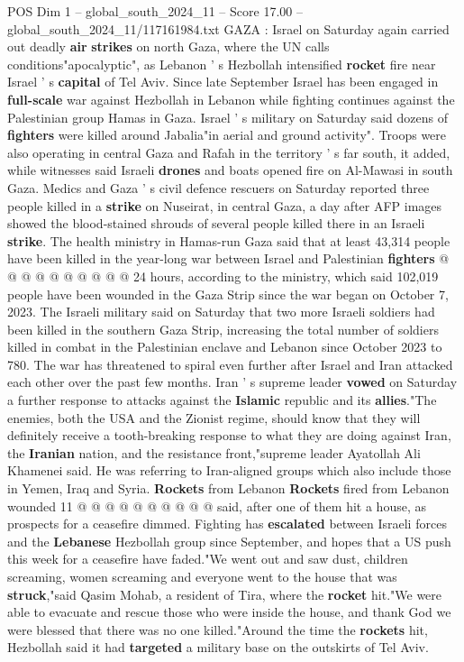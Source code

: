 \begin{textsample}{POS Dim 1 – global\_south\_2024\_11 – Score 17.00 – global\_south\_2024\_11/117161984.txt}  \label{ex:f1_pos_179}
GAZA : Israel on Saturday again carried out deadly \textbf{air} \textbf{strikes} on north Gaza, where the UN calls conditions"apocalyptic", as Lebanon ' s Hezbollah intensified \textbf{rocket} fire near Israel ' s \textbf{capital} of Tel Aviv.
Since late September Israel has been engaged in \textbf{full-scale} war against Hezbollah in Lebanon while fighting continues against the Palestinian group Hamas in Gaza.
Israel ' s military on Saturday said dozens of \textbf{fighters} were killed around Jabalia"in aerial and ground activity".
Troops were also operating in central Gaza and Rafah in the territory ' s far south, it added, while witnesses said Israeli \textbf{drones} and boats opened fire on Al-Mawasi in south Gaza.
Medics and Gaza ' s civil defence rescuers on Saturday reported three people killed in a \textbf{strike} on Nuseirat, in central Gaza, a day after AFP images showed the blood-stained shrouds of several people killed there in an Israeli \textbf{strike}.
The health ministry in Hamas-run Gaza said that at least 43,314 people have been killed in the year-long war between Israel and Palestinian \textbf{fighters} @ @ @ @ @ @ @ @ @ @ 24 hours, according to the ministry, which said 102,019 people have been wounded in the Gaza Strip since the war began on October 7, 2023.
The Israeli military said on Saturday that two more Israeli soldiers had been killed in the southern Gaza Strip, increasing the total number of soldiers killed in combat in the Palestinian enclave and Lebanon since October 2023 to 780.
The war has threatened to spiral even further after Israel and Iran attacked each other over the past few months.
Iran ' s supreme leader \textbf{vowed} on Saturday a further response to attacks against the \textbf{Islamic} republic and its \textbf{allies}."The enemies, both the USA and the Zionist regime, should know that they will definitely receive a tooth-breaking response to what they are doing against Iran, the \textbf{Iranian} nation, and the resistance front,"supreme leader Ayatollah Ali Khamenei said.
He was referring to Iran-aligned groups which also include those in Yemen, Iraq and Syria. \textbf{Rockets} from Lebanon \textbf{Rockets} fired from Lebanon wounded 11 @ @ @ @ @ @ @ @ @ @ said, after one of them hit a house, as prospects for a ceasefire dimmed.
Fighting has \textbf{escalated} between Israeli forces and the \textbf{Lebanese} Hezbollah group since September, and hopes that a US push this week for a ceasefire have faded."We went out and saw dust, children screaming, women screaming and everyone went to the house that was \textbf{struck},"said Qasim Mohab, a resident of Tira, where the \textbf{rocket} hit."We were able to evacuate and rescue those who were inside the house, and thank God we were blessed that there was no one killed."Around the time the \textbf{rockets} hit, Hezbollah said it had \textbf{targeted} a military base on the outskirts of Tel Aviv.

\end{textsample}

